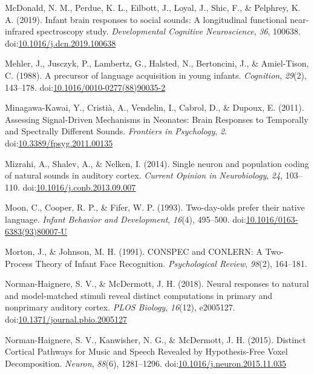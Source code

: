 \documentclass[man]{apa6}
\begin{document}
\hypertarget{ref-mcdonald_infant_2019}{}
McDonald, N. M., Perdue, K. L., Eilbott, J., Loyal, J., Shic, F., \&
Pelphrey, K. A. (2019). Infant brain responses to social sounds: A
longitudinal functional near-infrared spectroscopy study.
\emph{Developmental Cognitive Neuroscience}, \emph{36}, 100638.
doi:\href{https://doi.org/10.1016/j.dcn.2019.100638}{10.1016/j.dcn.2019.100638}

\hypertarget{ref-mehler_precursor_1988}{}
Mehler, J., Jusczyk, P., Lambertz, G., Halsted, N., Bertoncini, J., \&
Amiel-Tison, C. (1988). A precursor of language acquisition in young
infants. \emph{Cognition}, \emph{29}(2), 143--178.
doi:\href{https://doi.org/10.1016/0010-0277(88)90035-2}{10.1016/0010-0277(88)90035-2}

\hypertarget{ref-minagawa-kawai_assessing_2011}{}
Minagawa-Kawai, Y., Cristià, A., Vendelin, I., Cabrol, D., \& Dupoux, E.
(2011). Assessing Signal-Driven Mechanisms in Neonates: Brain Responses
to Temporally and Spectrally Different Sounds. \emph{Frontiers in
Psychology}, \emph{2}.
doi:\href{https://doi.org/10.3389/fpsyg.2011.00135}{10.3389/fpsyg.2011.00135}

\hypertarget{ref-mizrahi_single_2014}{}
Mizrahi, A., Shalev, A., \& Nelken, I. (2014). Single neuron and
population coding of natural sounds in auditory cortex. \emph{Current
Opinion in Neurobiology}, \emph{24}, 103--110.
doi:\href{https://doi.org/10.1016/j.conb.2013.09.007}{10.1016/j.conb.2013.09.007}

\hypertarget{ref-moon_two-day-olds_1993}{}
Moon, C., Cooper, R. P., \& Fifer, W. P. (1993). Two-day-olds prefer
their native language. \emph{Infant Behavior and Development},
\emph{16}(4), 495--500.
doi:\href{https://doi.org/10.1016/0163-6383(93)80007-U}{10.1016/0163-6383(93)80007-U}

\hypertarget{ref-morton_conspec_1991}{}
Morton, J., \& Johnson, M. H. (1991). CONSPEC and CONLERN: A Two-Process
Theory of Infant Face Recognition. \emph{Psychological Review},
\emph{98}(2), 164--181.

\hypertarget{ref-norman-haignere_neural_2018}{}
Norman-Haignere, S. V., \& McDermott, J. H. (2018). Neural responses to
natural and model-matched stimuli reveal distinct computations in
primary and nonprimary auditory cortex. \emph{PLOS Biology},
\emph{16}(12), e2005127.
doi:\href{https://doi.org/10.1371/journal.pbio.2005127}{10.1371/journal.pbio.2005127}

\hypertarget{ref-norman-haignere_distinct_2015}{}
Norman-Haignere, S. V., Kanwisher, N. G., \& McDermott, J. H. (2015).
Distinct Cortical Pathways for Music and Speech Revealed by
Hypothesis-Free Voxel Decomposition. \emph{Neuron}, \emph{88}(6),
1281--1296.
doi:\href{https://doi.org/10.1016/j.neuron.2015.11.035}{10.1016/j.neuron.2015.11.035}
\end{document}
